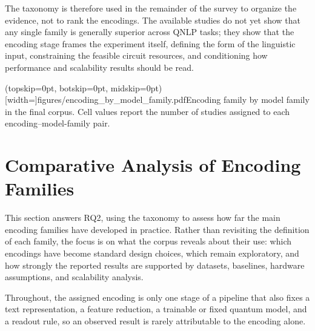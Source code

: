 \documentclass{ieeeaccess}
\begin{document}
The taxonomy is therefore used in the remainder of the survey to organize the evidence, not to rank the encodings. The available studies do not yet show that any single family is generally superior across QNLP tasks; they show that the encoding stage frames the experiment itself, defining the form of the linguistic input, constraining the feasible circuit resources, and conditioning how performance and scalability results should be read.

\Figure[t!](topskip=0pt, botskip=0pt, midskip=0pt)[width=\textwidth]{figures/encoding_by_model_family.pdf}{Encoding family by model family in the final corpus. Cell values report the number of studies assigned to each encoding--model-family pair.\label{fig:encoding_model_family}}

\section{Comparative Analysis of Encoding Families}
\label{sec:comparative_analysis}

This section answers RQ2, using the taxonomy to assess how far the main encoding families have developed in practice. Rather than revisiting the definition of each family, the focus is on what the corpus reveals about their use: which encodings have become standard design choices, which remain exploratory, and how strongly the reported results are supported by datasets, baselines, hardware assumptions, and scalability analysis.

Throughout, the assigned encoding is only one stage of a pipeline that also fixes a text representation, a feature reduction, a trainable or fixed quantum model, and a readout rule, so an observed result is rarely attributable to the encoding alone.
\end{document}
